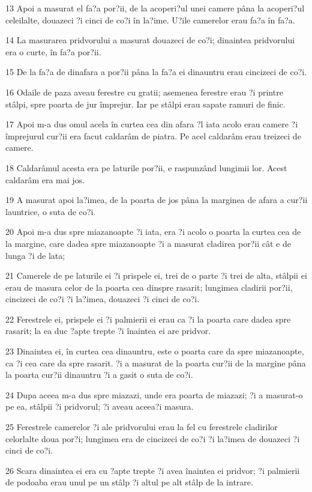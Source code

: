 \par 13 Apoi a masurat el fa?a por?ii, de la acoperi?ul unei camere pâna la acoperi?ul celeilalte, douazeci ?i cinci de co?i în la?ime. U?ile camerelor erau fa?a în fa?a.
\par 14 La masurarea pridvorului a masurat douazeci de co?i; dinaintea pridvorului era o curte, în fa?a por?ii.
\par 15 De la fa?a de dinafara a por?ii pâna la fa?a ei dinauntru erau cincizeci de co?i.
\par 16 Odaile de paza aveau ferestre cu gratii; asemenea ferestre erau ?i printre stâlpi, spre poarta de jur împrejur. Iar pe stâlpi erau sapate ramuri de finic.
\par 17 Apoi m-a dus omul acela în curtea cea din afara ?l iata acolo erau camere ?i împrejurul cur?ii era facut caldarâm de piatra. Pe acel caldarâm erau treizeci de camere.
\par 18 Caldarâmul acesta era pe laturile por?ii, e raspunzând lungimii lor. Acest caldarâm era mai jos.
\par 19 A masurat apoi la?imea, de la poarta de jos pâna la marginea de afara a cur?ii launtrice, o suta de co?i.
\par 20 Apoi m-a dus spre miazanoapte ?i iata, era ?i acolo o poarta la curtea cea de la margine, care dadea spre miazanoapte ?i a masurat cladirea por?ii cât e de lunga ?i de lata;
\par 21 Camerele de pe laturile ei ?i prispele ei, trei de o parte ?i trei de alta, stâlpii ei erau de masura celor de la poarta cea dinspre rasarit; lungimea cladirii por?ii, cincizeci de co?i ?i la?imea, douazeci ?i cinci de co?i.
\par 22 Ferestrele ei, prispele ei ?i palmierii ei erau ca ?i la poarta care dadea spre rasarit; la ea duc ?apte trepte ?i înaintea ei are pridvor.
\par 23 Dinaintea ei, în curtea cea dinauntru, este o poarta care da spre miazanoapte, ca ?i cea care da spre rasarit. ?i a masurat de la poarta cur?ii de la margine pâna la poarta cur?ii dinauntru ?i a gasit o suta de co?i.
\par 24 Dupa aceea m-a dus spre miazazi, unde era poarta de miazazi; ?i a masurat-o pe ea, stâlpii ?i pridvorul; ?i aveau aceea?i masura.
\par 25 Ferestrele camerelor ?i ale pridvorului erau la fel cu ferestrele cladirilor celorlalte doua por?i; lungimea era de cincizeci de co?i ?i la?imea de douazeci ?i cinci de co?i.
\par 26 Scara dinaintea ei era cu ?apte trepte ?i avea înaintea ei pridvor; ?i palmierii de podoaba erau unul pe un stâlp ?i altul pe alt stâlp de la intrare.
